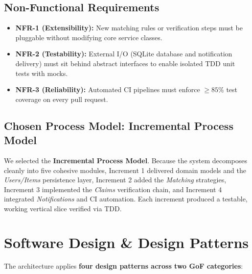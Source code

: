\documentclass[12pt,a4paper]{article}
\begin{document}
\subsection{Non-Functional Requirements}
\begin{itemize}
    \item \textbf{NFR-1 (Extensibility):} New matching rules or verification steps must be pluggable without modifying core service classes.
    \item \textbf{NFR-2 (Testability):} External I/O (SQLite database and notification delivery) must sit behind abstract interfaces to enable isolated TDD unit tests with mocks.
    \item \textbf{NFR-3 (Reliability):} Automated CI pipelines must enforce $\ge 85\%$ test coverage on every pull request.
\end{itemize}

\subsection{Chosen Process Model: Incremental Process Model}
We selected the \textbf{Incremental Process Model}. Because the system decomposes cleanly into five cohesive modules, Increment 1 delivered domain models and the \textit{Users/Items} persistence layer, Increment 2 added the \textit{Matching} strategies, Increment 3 implemented the \textit{Claims} verification chain, and Increment 4 integrated \textit{Notifications} and CI automation. Each increment produced a testable, working vertical slice verified via TDD.

\section{Software Design \& Design Patterns}
The architecture applies \textbf{four design patterns across two GoF categories}:
\end{document}
